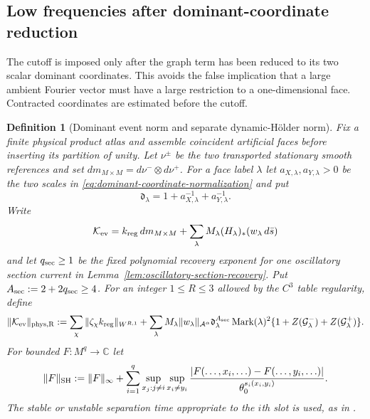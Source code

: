\documentclass[11pt]{article}
\newtheorem{definition}[theorem]{Definition}
\begin{document}
\subsection{Low frequencies after dominant-coordinate reduction}

The cutoff is imposed only after the graph term has been reduced to its two
scalar dominant coordinates.  This avoids the false implication that a large
ambient Fourier vector must have a large restriction to a one-dimensional
face.  Contracted coordinates are estimated before the cutoff.

\begin{definition}[Dominant event norm and separate dynamic-H\"older norm]
\label{def:event-current-norm}
Fix a finite physical product atlas and assemble coincident artificial faces
before inserting its partition of unity.  Let $\nu^\pm$ be the two
transported stationary smooth references and set
$dm_{M\times M}=d\nu^-\otimes d\nu^+$.  For a face label $\lambda$ let
$a_{X,\lambda},a_{Y,\lambda}>0$ be the two scales in
\eqref{eq:dominant-coordinate-normalization} and put
\[
 \mathfrak d_\lambda=1+a_{X,\lambda}^{-1}+a_{Y,\lambda}^{-1}.
\]
Write
\[
 \mathcal K_{\rm ev}=k_{\rm reg}\,dm_{M\times M}
 +\sum_\lambda M_\lambda(H_\lambda)_*(w_\lambda\,d\bar s)
\]
and let $q_{\rm sec}\ge1$ be the fixed polynomial recovery exponent for one
oscillatory section current in
Lemma~\ref{lem:oscillatory-section-recovery}.  Put
$A_{\rm sec}:=2+2q_{\rm sec}\ge4$.
For an integer $1\le R\le3$ allowed by the $C^3$ table regularity, define
\begin{equation}
\label{eq:event-physical-norm}
 \|\mathcal K_{\rm ev}\|_{\rm phys,R}:=
 \sum_\chi\|\zeta_\chi k_{\rm reg}\|_{W^{R,1}}
 +\sum_\lambda M_\lambda\|w_\lambda\|_{\mathcal A^\alpha}
 \mathfrak d_\lambda^{A_{\rm sec}}\operatorname{Mark}(\lambda)^2
 \{1+Z(\mathcal G_\lambda^-)+Z(\mathcal G_\lambda^+)\}.
\end{equation}
For bounded $F:M^q\to\mathbb C$ let
\begin{equation}
\label{eq:separate-dynamic-holder-norm}
 \|F\|_{\rm SH}:=\|F\|_\infty+
 \sum_{i=1}^q\sup_{x_j:j\ne i}\sup_{x_i\ne y_i}
 \frac{|F(\ldots,x_i,\ldots)-F(\ldots,y_i,\ldots)|}
      {\theta_0^{s_i(x_i,y_i)}}.
\end{equation}
The stable or unstable separation time appropriate to the $i$th slot is used,
as in \cite[Definition~2.2]{LS}.
\end{definition}
\end{document}
